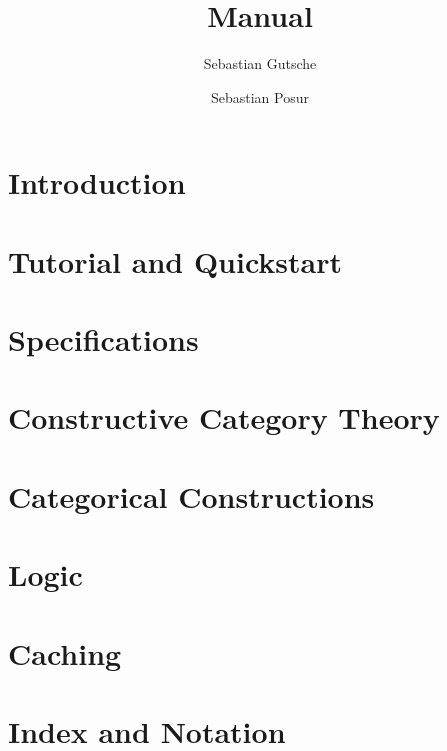 \documentclass[12pt]{amsbook}
\author{Sebastian Gutsche}
\author{Sebastian Posur}
\begin{document}
\title[Cap Manual]{\CapPkg Manual}

\maketitle

\chapter{Introduction}
  
  
\chapter{Tutorial and Quickstart}
  

\chapter{Specifications}\label{chapter:specifications}
  

\chapter{Constructive Category Theory}
  

\chapter{Categorical Constructions}\label{chapter:constructions}
  

\chapter{Logic}
  

\chapter{Caching}\label{chapter:caching}
  

\chapter{Index and Notation}
  





\end{document}
